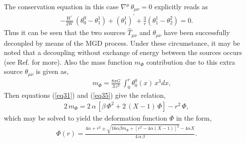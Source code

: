 \documentclass[]{aastex631}
\begin{document}
The conservation equation in this case  $\nabla^\mu\,\theta_{\mu\nu}=0$ explicitly reads as 
\begin{eqnarray}
-\frac{W^\prime}{2W}\,(\theta^0_0-\theta^1_1)+(\theta^1_1)^\prime+\frac{3}{r}(\theta^1_1-\theta^2_2)=0. \label{eq34}
\end{eqnarray}
Thus it can be seen that the two sources $\hat{T}_{\mu\nu}$ and $\theta_{\mu\nu}$ have been  successfully decoupled by means of the MGD process.   Under these circumstance, it may be noted that  a decoupling without exchange of energy between the sources occurs (see Ref. \cite{Ovalle2018} for more). Also the mass function $m_{\Phi}$ contribution due to this extra source $\theta_{\mu\nu}$ is given as,
\begin{eqnarray}
&& m_{\Phi}= \frac{8\pi G}{3\,c^2}\,\int_0^r \theta^0_0 (x)\, x^3 dx,  \label{eq35}
\end{eqnarray}
Then equations (\ref{eq31}) and (\ref{eq35}) give the relation,
\begin{eqnarray}
2\,m_{\Phi}= 2\,\alpha\,[\beta\,\Phi^2+2\,(X-1)\,\Phi]-r^2\,\Phi,  \label{eq36}
\end{eqnarray}
 which may be solved to yield the  deformation function $\Phi$ in the form,
\begin{eqnarray}
\Phi(r)= \frac{4 \alpha + r^2 \pm \sqrt{16 \alpha \beta m_{\Phi} + [r^2 - 4 \alpha (X-1)]^2} - 4 \alpha X}{4\,\alpha\,\beta}.  \label{eq37}
\end{eqnarray}
\end{document}
